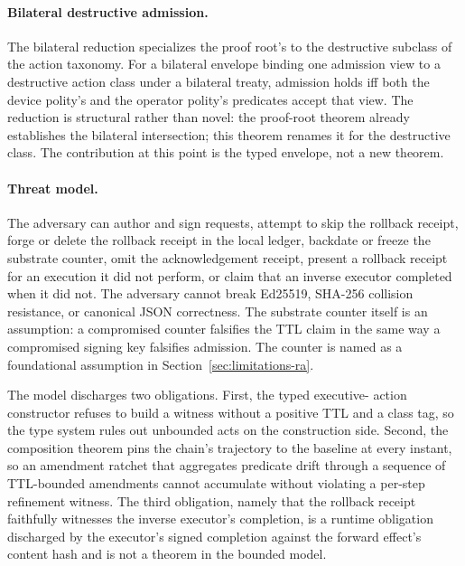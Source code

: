 \paragraph{Bilateral destructive admission.}
The bilateral reduction 
specializes the proof root's
 to the destructive
subclass of the action taxonomy. For a bilateral envelope binding one
admission view to a destructive action class under a bilateral treaty,
admission holds iff both the device polity's and the operator polity's
predicates accept that view. The reduction is structural rather
than novel: the proof-root theorem already establishes the bilateral
intersection; this theorem renames it for the destructive class. The
contribution at this point is the typed envelope, not a new theorem.

\paragraph{Threat model.}
The adversary can author and sign requests, attempt to skip the
rollback receipt, forge or delete the rollback receipt in the local
ledger, backdate or freeze the substrate counter, omit the
acknowledgement receipt, present a rollback receipt for an execution
it did not perform, or claim that an inverse executor completed when
it did not. The adversary cannot break Ed25519, SHA-256 collision
resistance, or canonical JSON correctness. The substrate counter
itself is an assumption: a compromised counter falsifies the TTL claim
in the same way a compromised signing key falsifies admission. The
counter is named as a foundational assumption in
Section~\ref{sec:limitations-ra}.

The model discharges two obligations. First, the typed executive-
action constructor refuses to build a witness without a positive TTL
and a class tag, so the type system rules out unbounded acts on the
construction side. Second, the composition theorem pins the chain's
trajectory to the baseline at every instant, so an amendment ratchet
that aggregates predicate drift through a sequence of TTL-bounded
amendments cannot accumulate without violating a per-step refinement
witness. The third obligation, namely that the rollback receipt
faithfully witnesses the inverse executor's completion, is a runtime
obligation discharged by the executor's signed completion against the
forward effect's content hash and is not a theorem in the bounded
model.
